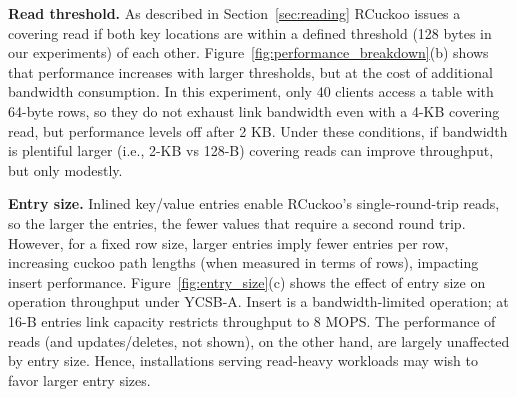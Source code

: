 \textbf{Read threshold.}
\label{sec:read_threshold}
As described in Section~\ref{sec:reading} RCuckoo issues a covering
read if both key locations are within a defined threshold (128 bytes
in our experiments) of each other.
Figure~\ref{fig:performance_breakdown}(b) shows that performance
increases with larger thresholds, but at the cost of additional
bandwidth consumption.  In this experiment, only 40 clients
access a table with 64-byte rows, so they do not exhaust link bandwidth even with a 4-KB covering read, but performance levels off after 2 KB.
Under these conditions, if bandwidth is plentiful larger (i.e., 2-KB
vs 128-B) covering reads can improve throughput, but only modestly.



\textbf{Entry size.}  Inlined key/value entries enable RCuckoo's
single-round-trip reads, so the larger the entries, the fewer values
that require a second round trip.  However, for a fixed row size,
larger entries imply fewer entries per row, increasing cuckoo path
lengths (when measured in terms of rows), impacting insert performance.
Figure~\ref{fig:entry_size}(c) shows the effect of entry size on
operation throughput under YCSB-A. Insert is a bandwidth-limited
operation;
at 16-B entries link capacity restricts throughput to 8 MOPS. The
performance of reads (and updates/deletes, not shown), on the other
hand, are largely unaffected by entry size.  Hence,
installations serving read-heavy workloads may wish to favor larger entry sizes.
%






